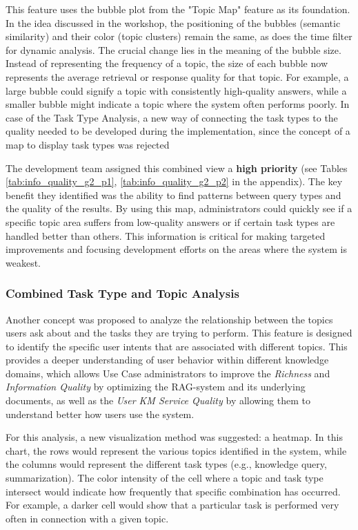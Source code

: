 \documentclass[
	english,
	ruledheaders=section,%
	class=report,%
	thesis={type=bachelor},%
	accentcolor=1b,%
	custommargins=true,%
	marginpar=false,%
	parskip=half-,%
	fontsize=11pt,%
	DIV=14,
]{tudapub}
\begin{document}
This feature uses the bubble plot from the "Topic Map" feature as its foundation. In the idea discussed in the workshop, the positioning of the bubbles (semantic similarity) and their color (topic clusters) remain the same, as does the time filter for dynamic analysis. The crucial change lies in the meaning of the bubble size. Instead of representing the frequency of a topic, the size of each bubble now represents the average retrieval or response quality for that topic. For example, a large bubble could signify a topic with consistently high-quality answers, while a smaller bubble might indicate a topic where the system often performs poorly. In case of the Task Type Analysis, a new way of connecting the task types to the quality needed to be developed during the implementation, since the concept of a map to display task types was rejected

The development team assigned this combined view a \textbf{high priority} (see Tables \ref{tab:info_quality_g2_p1},  \ref{tab:info_quality_g2_p2} in the appendix). The key benefit they identified was the ability to find patterns between query types and the quality of the results. By using this map, administrators could quickly see if a specific topic area suffers from low-quality answers or if certain task types are handled better than others. This information is critical for making targeted improvements and focusing development efforts on the areas where the system is weakest.
\subsubsection{Combined Task Type and Topic Analysis}
Another concept was proposed to analyze the relationship between the topics users ask about and the tasks they are trying to perform. This feature is designed to identify the specific user intents that are associated with different topics. This provides a deeper understanding of user behavior within different knowledge domains, which allows Use Case administrators to improve the \textit{Richness} and \textit{Information Quality} \parencite[pp.~57--58]{Jennex2006} by optimizing the RAG-system and its underlying documents, as well as the \textit{User KM Service Quality} \parencite[pp.~58--59]{Jennex2006} by allowing them to understand better how users use the system.

For this analysis, a new visualization method was suggested: a heatmap. In this chart, the rows would represent the various topics identified in the system, while the columns would represent the different task types (e.g., knowledge query, summarization). The color intensity of the cell where a topic and task type intersect would indicate how frequently that specific combination has occurred. For example, a darker cell would show that a particular task is performed very often in connection with a given topic.
\end{document}
